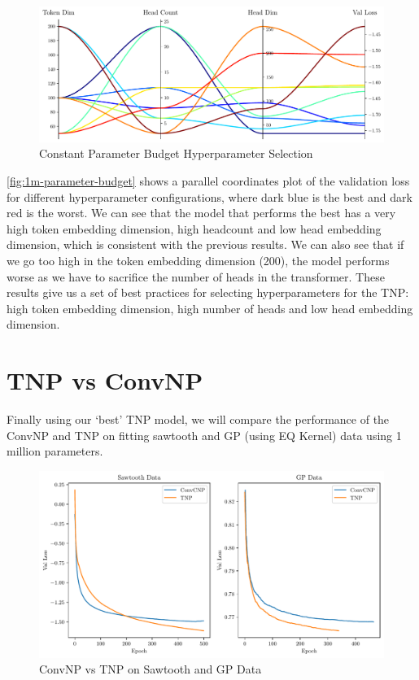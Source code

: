\documentclass[../../main.tex]{subfiles}
\begin{document}

\FloatBarrier
\begin{figure}[ht!]
	\centering
	\includegraphics[width=0.9\linewidth]{./model-comparsion-1d.pdf}
	\caption{Constant Parameter Budget Hyperparameter Selection}
	\label{fig:1m-parameter-budget}
\end{figure}
\FloatBarrier

\autoref{fig:1m-parameter-budget} shows a parallel coordinates plot of the validation loss for different hyperparameter configurations, where dark blue is the best and dark red is the worst. We can see that the model that performs the best has a very high token embedding dimension, high headcount and low head embedding dimension, which is consistent with the previous results. We can also see that if we go too high in the token embedding dimension (200), the model performs worse as we have to sacrifice the number of heads in the transformer. These results give us a set of best practices for selecting hyperparameters for the TNP: high token embedding dimension, high number of heads and low head embedding dimension.





\section{TNP vs ConvNP}


Finally using our `best' TNP model, we will compare the performance of the ConvNP and TNP on fitting sawtooth and GP (using EQ Kernel) data using 1 million parameters. 


\begin{figure}[H]
	\centering
	\includegraphics[width=0.9\linewidth]{./convcnp-vs-tetnp-saw-gp.pdf}
	\caption{ConvNP vs TNP on Sawtooth and GP Data}
	\label{fig:conv-tnp-1d-result}
\end{figure}
\end{document}
